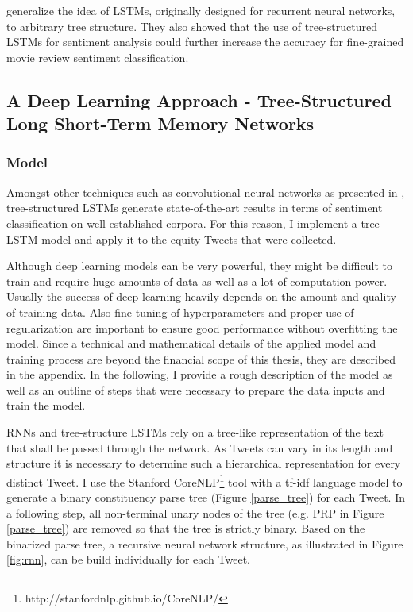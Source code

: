 \documentclass[a4paper,12pt]{article}%
\begin{document}
\cite{Tai2015} generalize the idea of LSTMs, originally designed for recurrent neural networks, to arbitrary tree structure. They also showed that the use of tree-structured LSTMs for sentiment analysis could further increase the accuracy for fine-grained movie review sentiment classification.

\subsection{A Deep Learning Approach - Tree-Structured Long Short-Term Memory Networks \label{tree_lstm}}

\subsubsection{Model}
Amongst other techniques such as convolutional neural networks as presented in \citet{Kim2014}, tree-structured LSTMs generate state-of-the-art results in terms of sentiment classification on well-established corpora. For this reason, I implement a tree LSTM model and apply it to the equity Tweets that were collected.

Although deep learning models can be very powerful, they might be difficult to train and require huge amounts of data as well as a lot of computation power. Usually the success of deep learning heavily depends on the amount and quality of training data. Also fine tuning of hyperparameters and proper use of regularization are important to ensure good performance without overfitting the model.
Since a technical and mathematical details of the applied model and training process are beyond the financial scope of this thesis, they are described in the appendix. In the following, I provide a rough description of the model as well as an outline of steps that were necessary to prepare the data inputs and train the model.

RNNs and tree-structure LSTMs rely on a tree-like representation of the text that shall be passed through the network. As Tweets can vary in its length and structure it is necessary to determine such a hierarchical representation for every distinct Tweet. I use the Stanford CoreNLP\footnote{http://stanfordnlp.github.io/CoreNLP/} tool with a tf-idf language model to generate a binary constituency parse tree (Figure \ref{parse_tree}) for each Tweet. In a following step, all non-terminal unary nodes of the tree (e.g. PRP in Figure \ref{parse_tree}) are removed so that the tree is strictly binary. Based on the binarized parse tree, a recursive neural network structure, as illustrated in Figure \ref{fig:rnn}, can be build individually for each Tweet.
\end{document}
